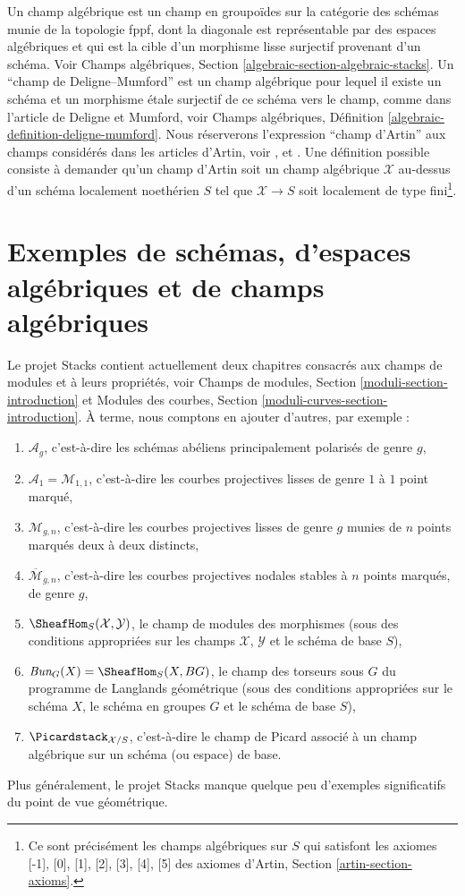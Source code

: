 \noindent
Un champ algébrique est un champ en groupoïdes sur la catégorie des schémas
munie de la topologie fppf, dont la diagonale est représentable par des
espaces algébriques et qui est la cible d'un morphisme lisse surjectif provenant d'un schéma.
Voir Champs algébriques, Section \ref{algebraic-section-algebraic-stacks}.
Un ``champ de Deligne--Mumford'' est un champ algébrique pour lequel il existe
un schéma et un morphisme \'etale surjectif de ce schéma vers le champ,
comme dans l'article \cite{DM} de Deligne et Mumford, voir
Champs algébriques, Définition \ref{algebraic-definition-deligne-mumford}.
Nous réserverons l'expression ``champ d'Artin'' aux champs considérés dans les articles
d'Artin, voir \cite{ArtinI}, \cite{ArtinII} et \cite{ArtinVersal}.
Une définition possible consiste à demander qu'un champ d'Artin soit un champ algébrique
$\mathcal{X}$ au-dessus d'un schéma localement noethérien $S$ tel que
$\mathcal{X} \to S$ soit
localement de type fini\footnote{Ce sont précisément les champs algébriques
sur $S$ qui satisfont les axiomes [-1], [0], [1], [2], [3], [4], [5]
des axiomes d'Artin, Section \ref{artin-section-axioms}.}.


\section{Exemples de schémas, d'espaces algébriques et de champs algébriques}
\label{section-examples-stacks}

\noindent
Le projet Stacks contient actuellement deux chapitres consacrés aux
champs de modules et à leurs propriétés, voir
Champs de modules, Section \ref{moduli-section-introduction} et
Modules des courbes, Section \ref{moduli-curves-section-introduction}.
À terme, nous comptons en ajouter d'autres, par exemple :
\begin{enumerate}
\item $\mathcal{A}_g$,
c'est-à-dire les schémas abéliens principalement polarisés de genre $g$,
\item $\mathcal{A}_1 = \mathcal{M}_{1, 1}$, c'est-à-dire
les courbes projectives lisses de genre $1$ à $1$ point marqué,
\item $\mathcal{M}_{g, n}$, c'est-à-dire les courbes projectives lisses de genre $g$
munies de $n$ points marqués deux à deux distincts,
\item $\overline{\mathcal{M}}_{g, n}$, c'est-à-dire les
courbes projectives nodales stables à $n$ points marqués, de genre $g$,
\item $\SheafHom_S(\mathcal{X}, \mathcal{Y})$, le champ de modules des morphismes
(sous des conditions appropriées sur les champs $\mathcal{X}$, $\mathcal{Y}$
et le schéma de base $S$),
\item $\textit{Bun}_G(X) = \SheafHom_S(X, BG)$, le champ des torseurs sous $G$
du programme de Langlands géométrique (sous des conditions appropriées sur le schéma
$X$, le schéma en groupes $G$ et le schéma de base $S$),
\item $\Picardstack_{\mathcal{X}/S}$, c'est-à-dire le champ de Picard associé
à un champ algébrique sur un schéma (ou espace) de base.
\end{enumerate}
Plus généralement, le projet Stacks manque quelque peu
d'exemples significatifs du point de vue géométrique.


